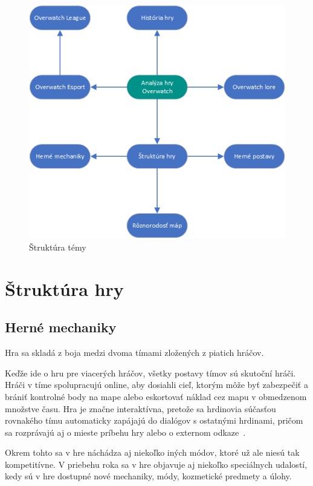 \documentclass[10pt,oneside,slovak,a4paper]{article}
\begin{document}
\begin{figure}[h!]
\includegraphics[scale=1]{images/struktura_temy.png}
\caption{Štruktúra témy}
\end{figure}


\section{Štruktúra hry} \label{Herné mechaniky}

\subsection{Herné mechaniky} \label{Herné mechaniky}


Hra sa skladá z boja medzi dvoma tímami zložených z piatich hráčov. 

Keďže ide o hru pre viacerých hráčov, všetky postavy tímov sú skutoční hráči. Hráči v tíme spolupracujú online, aby dosiahli cieľ, ktorým môže byť zabezpečiť a brániť kontrolné body na mape alebo eskortovať náklad cez mapu v obmedzenom množstve času. Hra je značne interaktívna, pretože sa hrdinovia súčasťou rovnakého tímu automaticky zapájajú do dialógov s ostatnými hrdinami, pričom sa rozprávajú aj o mieste príbehu hry alebo o externom odkaze~\cite{Overwatchbook}.

Okrem tohto sa v hre náchádza aj niekoľko iných módov, ktoré už ale niesú tak kompetitívne. V priebehu roka sa v hre objavuje aj niekoľko speciálnych udalostí,
 kedy sú v hre dostupné nové mechaniky, módy, kozmetické predmety a úlohy.
\end{document}

